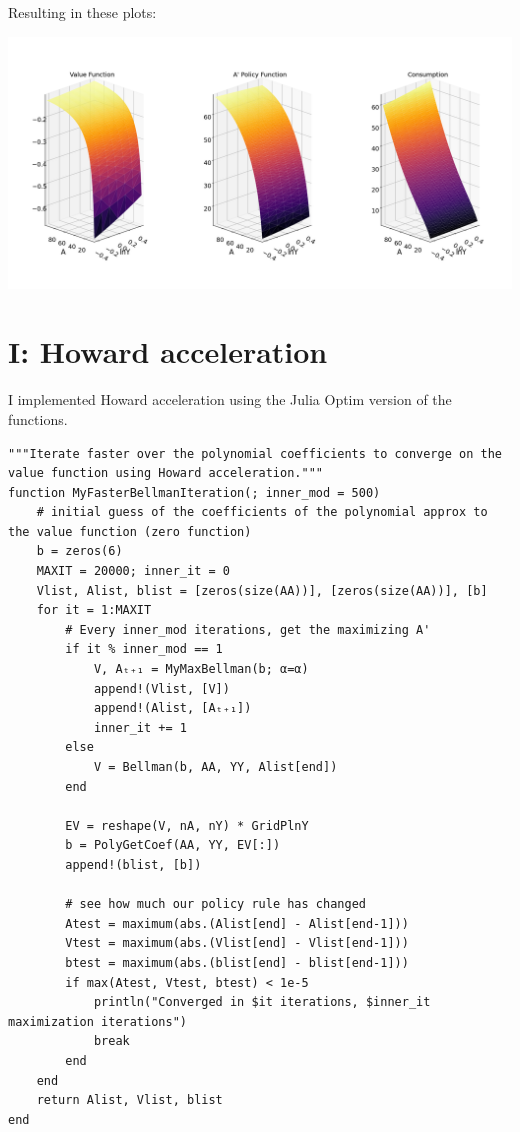 \documentclass[12pt]{article}
\begin{document}
\newpage
Resulting in these plots:



\includegraphics[width=\textwidth]{problem sets/ps8/H-all.png}











\newpage
\section*{I: Howard acceleration}

I implemented Howard acceleration using the Julia Optim version of the functions. 


\begin{lstlisting}[language=JuliaLocal, style=julia]
"""Iterate faster over the polynomial coefficients to converge on the value function using Howard acceleration."""
function MyFasterBellmanIteration(; inner_mod = 500)
    # initial guess of the coefficients of the polynomial approx to the value function (zero function)
    b = zeros(6)
    MAXIT = 20000; inner_it = 0
    Vlist, Alist, blist = [zeros(size(AA))], [zeros(size(AA))], [b]
    for it = 1:MAXIT
        # Every inner_mod iterations, get the maximizing A'
        if it % inner_mod == 1
            V, Aₜ₊₁ = MyMaxBellman(b; α=α)
            append!(Vlist, [V])
            append!(Alist, [Aₜ₊₁])
            inner_it += 1
        else
            V = Bellman(b, AA, YY, Alist[end])
        end

        EV = reshape(V, nA, nY) * GridPlnY
        b = PolyGetCoef(AA, YY, EV[:])
        append!(blist, [b])

        # see how much our policy rule has changed
        Atest = maximum(abs.(Alist[end] - Alist[end-1]))
        Vtest = maximum(abs.(Vlist[end] - Vlist[end-1]))
        btest = maximum(abs.(blist[end] - blist[end-1]))
        if max(Atest, Vtest, btest) < 1e-5
            println("Converged in $it iterations, $inner_it maximization iterations")
            break
        end        
    end
    return Alist, Vlist, blist
end
\end{lstlisting}
\end{document}
